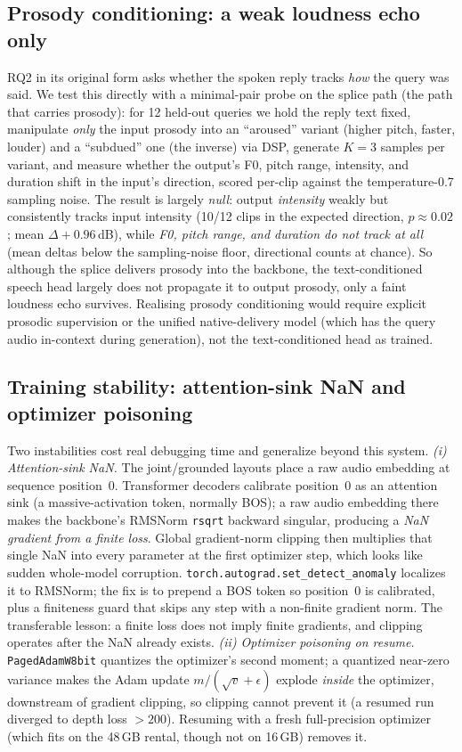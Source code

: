 \documentclass[11pt]{article}
\begin{document}
\subsection{Prosody conditioning: a weak loudness echo only}
\label{sec:prosody}
RQ2 in its original form asks whether the spoken reply tracks \emph{how} the query
was said. We test this directly with a minimal-pair probe on the splice path (the
path that carries prosody): for 12 held-out queries we hold the reply text fixed,
manipulate \emph{only} the input prosody into an ``aroused'' variant (higher pitch,
faster, louder) and a ``subdued'' one (the inverse) via DSP, generate $K{=}3$
samples per variant, and measure whether the output's F0, pitch range, intensity,
and duration shift in the input's direction, scored per-clip against the
temperature-0.7 sampling noise. The result is largely \emph{null}: output
\emph{intensity} weakly but consistently tracks input intensity (10/12 clips in the
expected direction, $p\approx0.02$; mean $\Delta{+}0.96$\,dB), while \emph{F0, pitch
range, and duration do not track at all} (mean deltas below the sampling-noise
floor, directional counts at chance). So although the splice delivers prosody into
the backbone, the text-conditioned speech head largely does not propagate it to
output prosody, only a faint loudness echo survives. Realising prosody
conditioning would require explicit prosodic supervision or the unified
native-delivery model (which has the query audio in-context during generation),
not the text-conditioned head as trained.

\subsection{Training stability: attention-sink NaN and optimizer poisoning}
\label{sec:stability}
Two instabilities cost real debugging time and generalize beyond this system.
\emph{(i) Attention-sink NaN.} The joint/grounded layouts place a raw audio
embedding at sequence position~0. Transformer decoders calibrate position~0 as an
attention sink (a massive-activation token, normally BOS); a raw audio embedding
there makes the backbone's RMSNorm \texttt{rsqrt} backward singular, producing a
\emph{NaN gradient from a finite loss}. Global gradient-norm clipping then
multiplies that single NaN into every parameter at the first optimizer step,
which looks like sudden whole-model corruption. \texttt{torch.autograd.set\_detect\_anomaly}
localizes it to RMSNorm; the fix is to prepend a BOS token so position~0 is
calibrated, plus a finiteness guard that skips any step with a non-finite
gradient norm. The transferable lesson: a finite loss does not imply finite
gradients, and clipping operates after the NaN already exists.
\emph{(ii) Optimizer poisoning on resume.} \texttt{PagedAdamW8bit} quantizes the
optimizer's second moment; a quantized near-zero variance makes the Adam update
$m/(\sqrt{v}{+}\epsilon)$ explode \emph{inside} the optimizer, downstream of
gradient clipping, so clipping cannot prevent it (a resumed run diverged to depth
loss ${>}200$). Resuming with a fresh full-precision optimizer (which fits on the
48\,GB rental, though not on 16\,GB) removes it.
\end{document}
